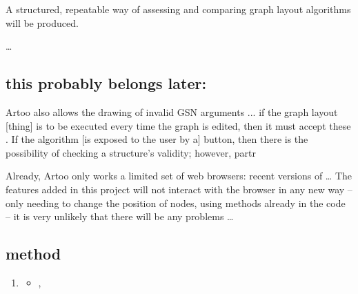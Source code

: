 A structured, repeatable way of assessing and comparing graph layout algorithms will be produced. 

\ldots

\subsection{this probably belongs later:}

Artoo also allows the drawing of invalid GSN arguments ...
if the graph layout [thing] is to be executed every time the graph is edited,  then it must accept these .
If the algorithm [is exposed to the user by a] button, then there is the possibility of checking a structure's validity; however, partr

Already, Artoo only works a limited set of web browsers: recent versions of \ldots
The features added in this project will not interact with the browser in any new way -- only needing to change the position of nodes, using methods already in the code -- it is very unlikely that there will be any problems \ldots

\subsection{method}


  \begin{enumerate}
    \item
      \begin{itemize}
      \item ,
    \end{itemize}
  \end{enumerate}
